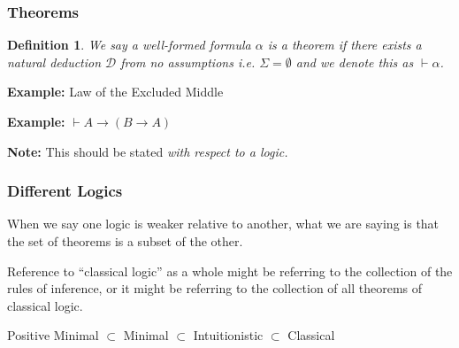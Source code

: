 \documentclass{beamer}
\theoremstyle{indentDefn} \newtheorem{defn}[]{Definition}
\begin{document}
\begin{frame}
	\frametitle{Theorems}
	\begin{defn} We say a well-formed formula $\alpha$ is a theorem if there exists a natural deduction $\mathcal{D}$ from no assumptions i.e. $\Sigma = \emptyset$ and we denote this as $\vdash \alpha$. \end{defn}
	
	\vspace{0.5cm}
	
	{\bf Example:} Law of the Excluded Middle
	
	\vspace{0.5cm}
	
	{\bf Example:} $\vdash A \rightarrow (B \rightarrow A)$
	
	\vspace{1cm}
	
	{\bf Note:} This should be stated \emph{with respect to a logic.}	
\end{frame}

\begin{frame}
	\frametitle{Different Logics}

	When we say one logic is weaker relative to another, what we are saying is that the set of theorems is a subset of the other. 

	\vspace{0.5cm}

	Reference to ``classical logic'' as a whole might be referring to the collection of the rules of inference, or it might be referring to the collection of all theorems of classical logic. 

	\vspace{0.5cm}

	\begin{center}
	Positive Minimal $\subset$ Minimal $\subset$ Intuitionistic $\subset$ Classical
	\end{center}

\end{frame}





\end{document}
